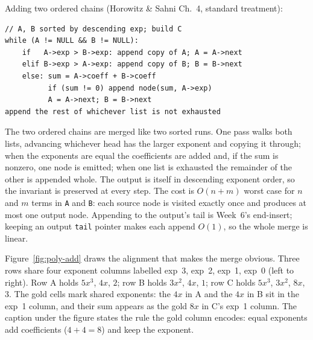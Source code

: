 \documentclass[11pt]{article}
\begin{document}
Adding two ordered chains (Horowitz \& Sahni Ch.~4, standard treatment):

{\footnotesize
\begin{verbatim}
// A, B sorted by descending exp; build C
while (A != NULL && B != NULL):
    if   A->exp > B->exp: append copy of A; A = A->next
    elif B->exp > A->exp: append copy of B; B = B->next
    else: sum = A->coeff + B->coeff
          if (sum != 0) append node(sum, A->exp)
          A = A->next; B = B->next
append the rest of whichever list is not exhausted
\end{verbatim}
}

The two ordered chains are merged like two sorted runs. One pass walks both lists, advancing whichever head has the larger exponent and copying it through; when the exponents are equal the coefficients are added and, if the sum is nonzero, one node is emitted; when one list is exhausted the remainder of the other is appended whole. The output is itself in descending exponent order, so the invariant is preserved at every step. The cost is $O(n + m)$ worst case for $n$ and $m$ terms in \texttt{A} and \texttt{B}: each source node is visited exactly once and produces at most one output node. Appending to the output's tail is Week~6's end-insert; keeping an output \texttt{tail} pointer makes each append $O(1)$, so the whole merge is linear. \cite{HorowitzSahni2008_fundamentals_data_structures}

Figure~\ref{fig:poly-add} draws the alignment that makes the merge obvious. Three rows share four exponent columns labelled exp~3, exp~2, exp~1, exp~0 (left to right). Row A holds $5x^{3}$, $4x$, $2$; row B holds $3x^{2}$, $4x$, $1$; row C holds $5x^{3}$, $3x^{2}$, $8x$, $3$. The gold cells mark shared exponents: the $4x$ in A and the $4x$ in B sit in the exp~1 column, and their sum appears as the gold $8x$ in C's exp~1 column. The caption under the figure states the rule the gold column encodes: equal exponents add coefficients ($4 + 4 = 8$) and keep the exponent.
\end{document}
